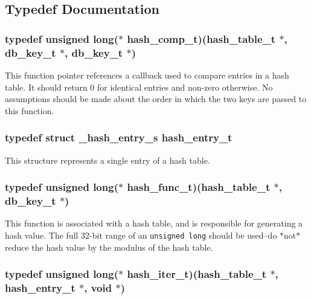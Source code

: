 \subsection{Typedef Documentation}
\subsubsection{\setlength{\rightskip}{0pt plus 5cm}typedef unsigned long($\ast$ hash\_\-comp\_\-t)({\bf hash\_\-table\_\-t} $\ast$, {\bf db\_\-key\_\-t} $\ast$, {\bf db\_\-key\_\-t} $\ast$)}\label{group__dbprim__hash_a4}




 This function pointer references a callback used to compare entries in a hash table. It should return 0 for identical entries and non-zero otherwise. No assumptions should be made about the order in which the two keys are passed to this function. 
\subsubsection{\setlength{\rightskip}{0pt plus 5cm}typedef struct \_\-hash\_\-entry\_\-s hash\_\-entry\_\-t}\label{group__dbprim__hash_a1}




 This structure represents a single entry of a hash table. 
\subsubsection{\setlength{\rightskip}{0pt plus 5cm}typedef unsigned long($\ast$ hash\_\-func\_\-t)({\bf hash\_\-table\_\-t} $\ast$, {\bf db\_\-key\_\-t} $\ast$)}\label{group__dbprim__hash_a3}




 This function is associated with a hash table, and is responsible for generating a hash value. The full 32-bit range of an {\tt unsigned long} should be used--do $\ast$not$\ast$ reduce the hash value by the modulus of the hash table. 
\subsubsection{\setlength{\rightskip}{0pt plus 5cm}typedef unsigned long($\ast$ hash\_\-iter\_\-t)({\bf hash\_\-table\_\-t} $\ast$, {\bf hash\_\-entry\_\-t} $\ast$, void $\ast$)}\label{group__dbprim__hash_a2}




